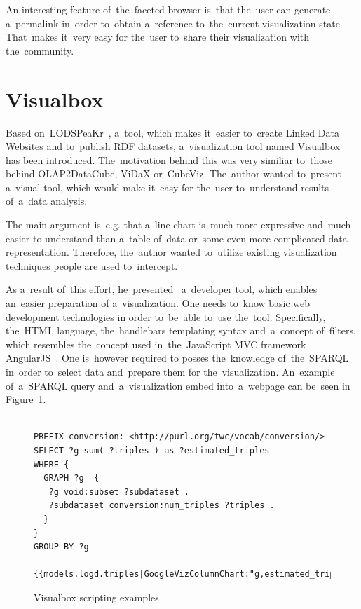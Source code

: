 An interesting feature of~the~faceted browser is~that the~user can 
generate a~permalink in~order to~obtain a~reference to~the~current visualization 
state. That~makes it~very easy for the~user to~share their visualization with the~community.

\section{Visualbox}
Based on~LODSPeaKr~\cite{lodspeakr}, a~tool, which makes it~easier to~create Linked Data Websites 
and to~publish RDF datasets, a~visualization tool named Visualbox~\cite{visualbox} has been 
introduced. The~motivation behind this was very similiar to~those behind 
OLAP2DataCube, ViDaX or~CubeViz. The~author wanted to~present a~visual tool,
which would 
make it~easy for the~user to~understand results of~a~data analysis.

The main argument is~e.g. that a~line chart is~much more expressive and~much easier
to understand than a~table of~data or~some even more complicated data 
representation. Therefore, the~author wanted to~utilize existing visualization 
techniques people are used to~intercept.

As a~result of~this effort, he~presented~\cite{visualbox-paper} a~developer tool, which enables an~easier preparation
of a~visualization. One needs to~know basic web development technologies 
in order to~be~able to~use the~tool. Specifically, the~HTML language, the~handlebars templating syntax and~a~concept of~filters, which resembles the~concept used in~the~JavaScript MVC framework AngularJS~\cite{angularjs}. One is~however required
to posses the~knowledge of~the~SPARQL in~order to~select data and~prepare them for the~visualization. An~example of~a~SPARQL query and~a~visualization embed into~a~webpage can be~seen
in Figure~\ref{visualbox-example}.

\begin{figure}
\scriptsize\begin{verbatim}

PREFIX conversion: <http://purl.org/twc/vocab/conversion/>
SELECT ?g sum( ?triples ) as ?estimated_triples
WHERE {
  GRAPH ?g  {
   ?g void:subset ?subdataset .
   ?subdataset conversion:num_triples ?triples .
  }
} 
GROUP BY ?g

{{models.logd.triples|GoogleVizColumnChart:"g,estimated_triples,width=1200"}}
\end{verbatim}\normalsize
\caption{Visualbox scripting examples}
\label{visualbox-example}
\end{figure}

